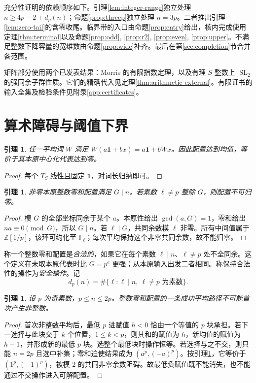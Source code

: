 \documentclass[11pt,a4paper]{article}
\newcommand{\Z}{\mathbb Z}
\newcommand{\F}{\mathbb F}
\newcommand{\SL}{\operatorname{SL}}
\newtheorem{lemma}[theorem]{引理}
\theoremstyle{definition}
\numberwithin{equation}{section}
\begin{document}
充分性证明的依赖顺序如下。引理\ref{lem:integer-range}独立处理 $n\ge4p-2+d_p(n)$；命题\ref{prop:threep}独立处理 $n=3p$。二者推出引理\ref{lem:zero-tail}的含零收尾。临界带的入口由命题\ref{prop:entry}给出，核内完成使用定理\ref{thm:terminal}以及命题\ref{prop:odd}, \ref{prop:r2}, \ref{prop:even}, \ref{prop:upper}。不满足整数下降容量的宽维数由命题\ref{prop:wide}补齐。最后在第\ref{sec:completion}节合并各范围。

矩阵部分使用两个已发表结果：Morris 的有限指数定理\cite[Theorem 6.1(2)]{morris}，以及有理 $S$ 整数上 $\SL_2$ 的强同余子群性质\cite{serre,prasad}。它们的精确代入见定理\ref{thm:arithmetic-external}。有限证书的输入全集及检验条件见附录\ref{app:certificates}。


\section{算术障碍与阈值下界}\label{sec:obstruction}
\begin{lemma}\label{lem:affine}
任一平均词 $W$ 满足 $W(a\mathbf1+bx)=a\mathbf1+bWx$。因此配置达到均值，等价于其本原中心化代表达到零。
\end{lemma}
\begin{proof}
每个 $T_S$ 线性且固定 $\mathbf1$，对词长归纳即可。
\end{proof}

\begin{lemma}\label{lem:obstruction}
非零本原整数零和配置满足 $G\mid n$。若素数 $\ell\ne p$ 整除 $G$，则配置不可归零。
\end{lemma}
\begin{proof}
模 $G$ 的全部坐标同余于某个 $a$。本原性给出 $\gcd(a,G)=1$，零和给出 $na\equiv0\pmod G$，所以 $G\mid n$。若 $\ell\mid G$，共同余数模 $\ell$ 非零。所有中间值属于 $\Z[1/p]$，该环可约化至 $\F_\ell$；每次平均保持这个非零共同余数，故不能归零。
\end{proof}

称一个整数零和配置是\emph{合法的}，如果它在每个素数 $\ell\mid n$、$\ell\ne p$ 处不全同余。这个定义在未取本原代表时比 $G=p^e$ 更强；从本原输入出发二者相同。称保持合法性的操作为\emph{安全操作}。记
\[
d_p(n)=\#\{\ell:\ell\mid n,\ \ell\ne p\text{ 为素数}\}.
\]

\begin{lemma}\label{lem:fraction}
设 $p$ 为奇素数，$p\le n\le2p$。整数零和配置的一条成功平均路径不可能首次产生非整数。
\end{lemma}
\begin{proof}
首次非整数平均后，最低 $p$ 进赋值 $h<0$ 恰由一个等值的 $p$ 块承担。若下一选择与此块交于 $k$ 个位置，$1\le k<p$，则其和的赋值为 $h$，新均值的赋值为 $h-1$，并形成新的最低 $p$ 块。选整个最低块时操作恒等。若选择与之不交，则只能 $n=2p$ 且选中补集；零和迫使结果成为 $(a^p,(-a)^p)$。按引理\ref{lem:affine}，它等价于 $(1^p,(-1)^p)$，被模 $2$ 的共同非零余数阻碍。故最低负赋值既不能消失，也不能通过不交操作进入可解配置。
\end{proof}
\end{document}
